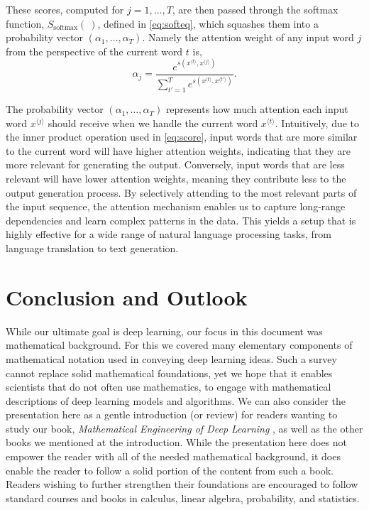 \documentclass[12pt]{article}
\begin{document}
These scores, computed for $j = 1,\ldots,T$, are then passed through the softmax function, $S_{\text{softmax}}(~)$, defined in \eqref{eq:softeq}, which squashes them into a probability vector $(\alpha_1, \ldots, \alpha_T)$. Namely the attention weight of any input word $j$ from the perspective of the current word $t$ is,
%
\begin{equation}
\label{eq:attentionweight}
\alpha_{j} = \frac{e^{s(x^{{\langle t \rangle}},x^{{\langle j \rangle}})}}{\sum_{t'=1}^T e^{s(x^{{\langle t \rangle}},x^{{\langle t' \rangle}})}}.
\end{equation}
%

The probability vector $(\alpha_1, \ldots, \alpha_T)$ represents how much attention each input word $x^{{\langle j \rangle}}$ should receive when we handle the current word $x^{{\langle t \rangle}}$. Intuitively, due to the inner product operation used in \eqref{eq:score}, input words that are more similar to the current word will have higher attention weights, indicating that they are more relevant for generating the output. Conversely, input words that are less relevant will have lower attention weights, meaning they contribute less to the output generation process. By selectively attending to the most relevant parts of the input sequence, the attention mechanism enables us to capture long-range dependencies and learn complex patterns in the data. This yields a setup that is highly effective for a wide range of natural language processing tasks, from language translation to text generation.

\section{Conclusion and Outlook}
\label{sec:conclusion}
While our ultimate goal is deep learning, our focus in this document was mathematical background. For this we covered many elementary components of mathematical notation used in conveying deep learning ideas. Such a survey cannot replace solid mathematical foundations, yet we hope that it enables scientists that do not often use mathematics, to engage with mathematical descriptions of deep learning models and algorithms. We can also consider the presentation here as a gentle introduction (or review) for readers wanting to study our book, {\em Mathematical Engineering of Deep Learning} \cite{LiquetMokaNazarathy2024DeepLearning}, as well as the other books we mentioned at the introduction. While the presentation here does not empower the reader with all of the needed mathematical background, it does enable the reader to follow a solid portion of the content from such a book. Readers wishing to further strengthen their foundations are encouraged to follow standard courses and books in calculus, linear algebra, probability, and statistics.\footnotemark{}
\end{document}
